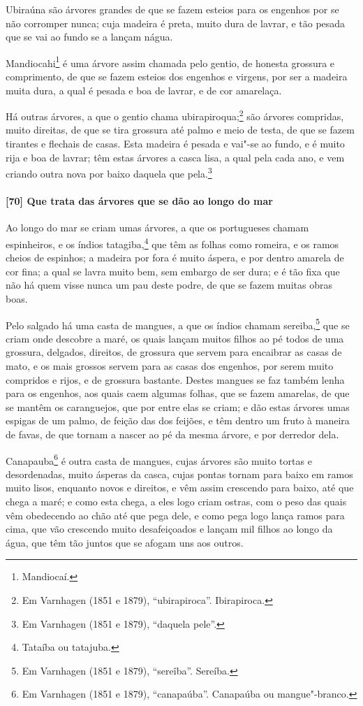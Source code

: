 Ubiraúna são árvores grandes de que se fazem esteios para os engenhos por se não corromper
nunca; cuja madeira é preta, muito dura de lavrar, e tão pesada que se vai ao fundo se a
lançam nágua.

Mandiocahi\footnote{ Mandiocaí.} é uma árvore assim chamada pelo gentio, de honesta
grossura e comprimento, de que se fazem esteios dos engenhos e virgens, por ser a madeira
muita dura, a qual é pesada e boa de lavrar, e de cor amarelaça.


Há outras árvores, a que o gentio chama ubirapiroqua;\footnote{ Em Varnhagen (1851 e
1879), ``ubirapiroca''. Ibirapiroca.} são árvores compridas, muito direitas, de que se
tira grossura até palmo e meio de testa, de que se fazem tirantes e flechais de casas.
Esta madeira é pesada e vai"-se ao fundo, e é muito rija e boa de lavrar; têm estas árvores
a casca lisa, a qual pela cada ano, e vem criando outra nova por baixo daquela que
pela.\footnote{ Em Varnhagen (1851 e 1879), ``daquela pele''.}

\paragraph{[70] Que trata das árvores que se dão ao longo do mar}\quad
Ao longo do mar se criam umas árvores, a que os portugueses chamam espinheiros, e os
índios tatagiba,\footnote{ Tataíba ou tatajuba.} que têm as folhas como romeira, e os
ramos cheios de espinhos; a madeira por fora é muito áspera, e por dentro amarela de cor
fina; a qual se lavra muito bem, sem embargo de ser dura; e é tão fixa que não há quem
visse nunca um pau deste podre, de que se fazem muitas obras boas.

Pelo salgado há uma casta de mangues, a que os índios chamam sereiba,\footnote{ Em
Varnhagen (1851 e 1879), ``sereîba''. Sereíba.} que se criam onde descobre a maré, os
quais lançam muitos filhos ao pé todos de uma grossura, delgados, direitos, de grossura
que servem para encaibrar as casas de mato, e os mais grossos servem para as casas dos
engenhos, por serem muito compridos e rijos, e de grossura bastante. Destes mangues se faz
também lenha para os engenhos, aos quais caem algumas folhas, que se fazem amarelas, de
que se mantêm os caranguejos, que por entre elas se criam; e dão estas árvores umas
espigas de um palmo, de feição das dos feijões, e têm dentro um fruto à maneira de favas,
de que tornam a nascer ao pé da mesma árvore, e por derredor dela.

Canapauba\footnote{ Em Varnhagen (1851 e 1879), ``canapaúba''. Canapaúba ou
mangue"-branco.} é outra casta de mangues, cujas árvores são muito tortas e desordenadas,
muito ásperas da casca, cujas pontas tornam para baixo em ramos muito lisos, enquanto
novos e direitos, e vêm assim crescendo para baixo, até que chega a maré; e como esta
chega, a eles logo criam ostras, com o peso das quais vêm obedecendo ao chão até que pega
dele, e como pega logo lança ramos para cima, que vão crescendo muito desafeiçoados e
lançam mil filhos ao longo da água, que têm tão juntos que se afogam uns aos outros.

